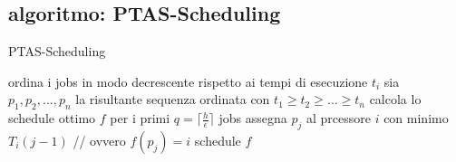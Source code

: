 \subsection*{algoritmo: PTAS-Scheduling}
\begin{flushleft}
	\begin{algorithm}
		\caption{PTAS-Scheduling}
		\begin{algorithmic}
			\STATE ordina i jobs in modo decrescente rispetto ai tempi di esecuzione $t_i$
			\STATE sia $p_1,p_2,\ldots,p_n$ la risultante sequenza ordinata con $t_1\geq t_2\geq\ldots\geq t_n$
			\STATE calcola lo schedule ottimo $f$ per i primi $q=\lceil\frac{h}{\epsilon}\rceil$ jobs
				\STATE assegna $p_j$ al prcessore $i$ con minimo $T_i(j-1)$ \color{gray}// ovvero $f(p_j)=i$\color{black}
			\ENDFOR
			\RETURN schedule $f$
		\end{algorithmic}
	\end{algorithm}
\end{flushleft}


